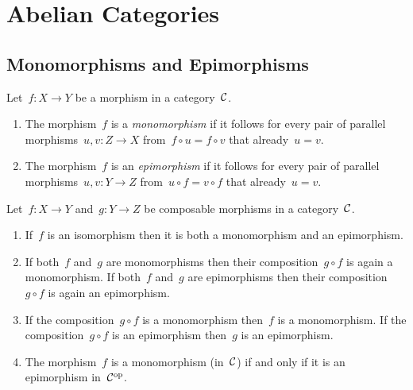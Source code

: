 \chapter{Abelian Categories}





\section{Monomorphisms and Epimorphisms}


\begin{definition}
  Let~$f \colon X \to Y$ be a morphism in a category~$\mathcal{C}$.
  \begin{enumerate}
    \item
      The morphism~$f$ is a \emph{monomorphism} if it follows for every pair of parallel morphisms~$u, v \colon Z \to X$ from~$f \circ u = f \circ v$ that already~$u = v$.
    \item
      The morphism~$f$ is an \emph{epimorphism} if it follows for every pair of parallel morphisms~$u, v \colon Y \to Z$ from~$u \circ f = v \circ f$ that already~$u = v$.
  \end{enumerate}
\end{definition}


\begin{remark}
  Let~$f \colon X \to Y$ and~$g \colon Y \to Z$ be composable morphisms in a category~$\mathcal{C}$.
  \begin{enumerate}
    \item
      If~$f$ is an isomorphism then it is both a monomorphism and an epimorphism.
    \item
      If both~$f$ and~$g$ are monomorphisms then their composition~$g \circ f$ is again a monomorphism.
      If both~$f$ and~$g$ are epimorphisms then their composition~$g \circ f$ is again an epimorphism.
    \item
      If the composition~$g \circ f$ is a monomorphism then~$f$ is a monomorphism.
      If the composition~$g \circ f$ is an epimorphism then~$g$ is an epimorphism.
    \item
      The morphism~$f$ is a monomorphism (in~$\mathcal{C}$) if and only if it is an epimorphism in~$\mathcal{C}^{\mathrm{op}}$.
  \end{enumerate}
\end{remark}


